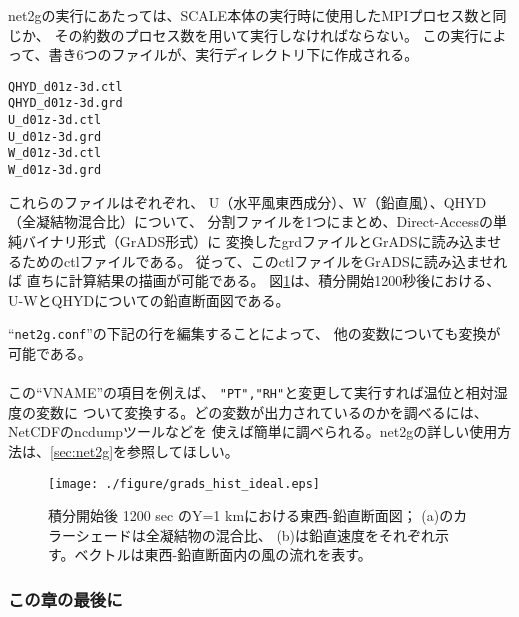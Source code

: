 \noindent net2gの実行にあたっては、SCALE本体の実行時に使用したMPIプロセス数と同じか、
その約数のプロセス数を用いて実行しなければならない。
この実行によって、書き6つのファイルが、実行ディレクトリ下に作成される。
\begin{alltt}
  QHYD_d01z-3d.ctl
  QHYD_d01z-3d.grd
  U_d01z-3d.ctl
  U_d01z-3d.grd
  W_d01z-3d.ctl
  W_d01z-3d.grd
\end{alltt}
これらのファイルはぞれぞれ、
U（水平風東西成分）、W（鉛直風）、QHYD（全凝結物混合比）について、
分割ファイルを1つにまとめ、Direct-Accessの単純バイナリ形式（GrADS形式）に
変換したgrdファイルとGrADSに読み込ませるためのctlファイルである。
従って、このctlファイルをGrADSに読み込ませれば
直ちに計算結果の描画が可能である。
図\ref{fig_ideal}は、積分開始1200秒後における、
U-WとQHYDについての鉛直断面図である。


``\verb|net2g.conf|''の下記の行を編集することによって、
他の変数についても変換が可能である。\\

\\

\noindent この``VNAME''の項目を例えば、
\verb|"PT","RH"|と変更して実行すれば温位と相対湿度の変数に
ついて変換する。どの変数が出力されているのかを調べるには、NetCDFのncdumpツールなどを
使えば簡単に調べられる。net2gの詳しい使用方法は、\ref{sec:net2g}を参照してほしい。


\begin{figure}[t]
\begin{center}
  \texttt{[image: ./figure/grads\_hist\_ideal.eps]}\\
  \caption{積分開始後 1200 sec のY=1 kmにおける東西-鉛直断面図；
           (a)のカラーシェードは全凝結物の混合比、
           (b)は鉛直速度をそれぞれ示す。ベクトルは東西-鉛直断面内の風の流れを表す。}
  \label{fig_ideal}
\end{center}
\end{figure}




\subsubsection{この章の最後に}

